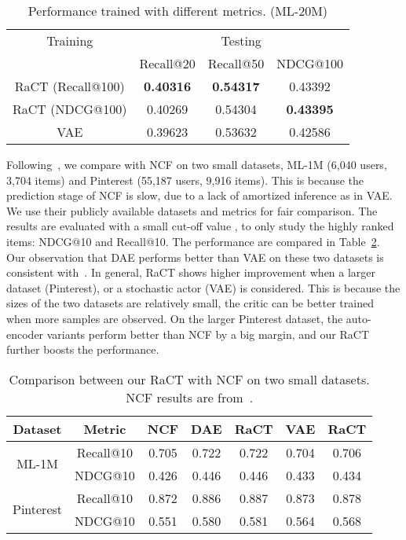 \documentclass{article} \usepackage{iclr2020_conference,times}
\begin{document}
\begin{table}[t!]
  \caption{Performance trained with different metrics. (ML-20M)}
  \label{tab:generalize_metrics}
    \centering
  \begin{tabular}{c|ccc}
    \toprule
      Training   & \multicolumn{3}{c}{Testing}   \\ \cline{2-4}
         & Recall@20 & Recall@50 & NDCG@100   \\
    \midrule   
       RaCT (Recall@100)  & \textbf{0.40316} & \textbf{0.54317} & 0.43392 \\
       RaCT (NDCG@100)  & 0.40269 & 0.54304 & \textbf{0.43395} \\
       VAE   & 0.39623 & 0.53632 & 0.42586 \\
  \bottomrule
\end{tabular}
\end{table}

Following~\citet{liang2018variational}, we compare with NCF on two small datasets, ML-1M (6,040 users, 3,704 items) and Pinterest (55,187 users, 9,916 items). This is because the prediction stage of NCF is slow, due to a lack of amortized inference as in VAE. We use their publicly available datasets and metrics for fair comparison.
The results are evaluated with a small cut-off value , to only study the highly ranked items: NDCG@10 and Recall@10. The performance are compared in Table~\ref{tab:compare_ncf}. 
Our observation that DAE performs better than VAE on these two datasets is consistent with~\citet{liang2018variational}. 
In general, RaCT shows higher improvement when a larger dataset (Pinterest), or a stochastic actor (VAE) is considered. This is because the sizes of the two datasets are relatively small, the critic can be better trained when more samples are observed.
On the larger Pinterest dataset, the auto-encoder variants perform better than NCF by a big margin, and our RaCT further boosts the performance.


\begin{table}[t!]
  \caption{Comparison between our RaCT with NCF on two small datasets. NCF results are from~\cite{liang2018variational}.}
  \vspace{0mm}
  \label{tab:compare_ncf}
    \centering
  \begin{tabular}{c|c|c|cc|cc}
    \toprule
   Dataset & Metric  &  NCF & DAE  & RaCT & VAE & RaCT \\ 
    \midrule   
    \multirow{2}{*}{ML-1M}
     & Recall@10   & 0.705 & 0.722 & 0.722 & 0.704 & 0.706 \\
     & NDCG@10     & 0.426 & 0.446 & 0.446 & 0.433 & 0.434 \\ \hline
    \multirow{2}{*}{Pinterest}
     & Recall@10    & 0.872 & 0.886 & 0.887 & 0.873 & 0.878 \\
     & NDCG@10      & 0.551 & 0.580 & 0.581 & 0.564 & 0.568  \\
  \bottomrule
\end{tabular}
\vspace{-0mm}
\end{table}
\end{document}
